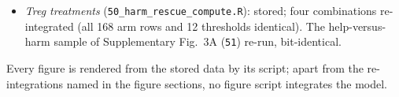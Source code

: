 \documentclass[11pt]{article}
\begin{document}
\begin{itemize}
  (\texttt{60}) and rescue probabilities (\texttt{63}) re-run, identical; one (unit,
  replicate) item partly re-integrated (12 of its runs), tail means agreeing to the seventh significant
  digit (largest relative difference $1.5\times10^{-5}$, in a tail variance) and every
  rescue outcome identical. The merge stage (\texttt{62}) needs the per-task output, which
  is held only on the cluster, and was not re-run.
\item \emph{Treg treatments} (\texttt{50\_harm\_rescue\_compute.R}): stored; four
  combinations re-integrated (all 168 arm rows and 12 thresholds identical). The
  help-versus-harm sample of Supplementary Fig.~3A (\texttt{51}) re-run,
  bit-identical.
\end{itemize}
Every figure is rendered from the stored data by its script; apart from the
re-integrations named in the figure sections, no figure script integrates the model.

\end{document}
